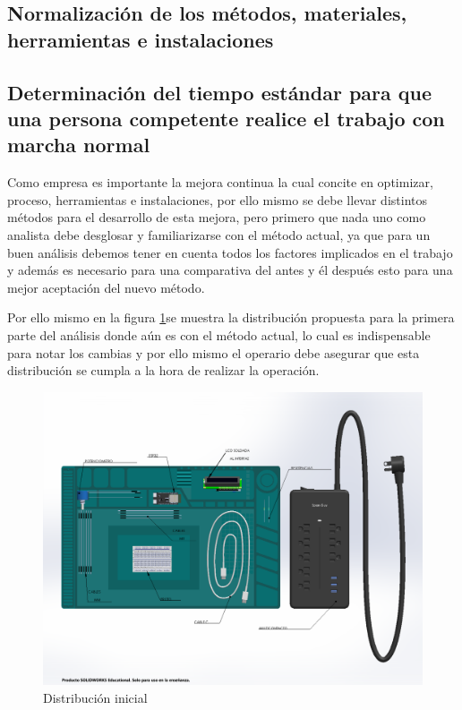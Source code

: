     \subsection{Normalización de los métodos, materiales, herramientas e instalaciones}
    
    \subsection{Determinación del tiempo estándar para que una persona competente realice el trabajo con marcha normal}
    
    
    
    Como empresa es importante la mejora continua la cual concite en optimizar, proceso, herramientas e instalaciones, por ello mismo se debe llevar distintos métodos para el desarrollo de esta mejora, pero primero que nada uno como analista debe desglosar y familiarizarse con el método actual, ya que para un buen análisis debemos tener en cuenta todos los factores implicados en el trabajo y además es necesario para una comparativa del antes y él después esto para una mejor aceptación del nuevo método.
    
    Por ello mismo en la figura \ref{fig:Distribucion inicial}se muestra la distribución propuesta para la primera parte del análisis donde aún es con el método actual, lo cual es indispensable para notar los cambias y por ello mismo el operario debe asegurar que esta distribución se cumpla a la hora de realizar la operación.
        \begin{figure}[H] 
        \centering
        \includegraphics[trim = {1mm 1mm 1mm 1mm},clip,scale=0.3]{22/Img/ensamblaje.pdf}
        \caption{Distribución inicial}
        \label{fig:Distribucion inicial}
    \end{figure}
    
